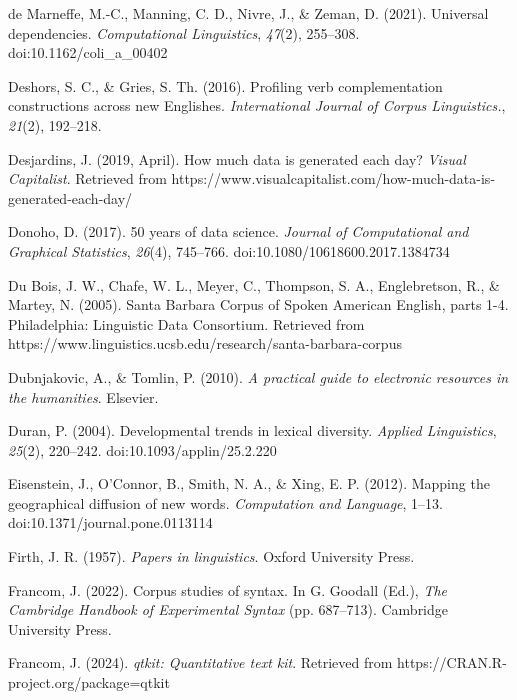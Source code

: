 \documentclass[
  letterpaper,
  krantz1]{latex/krantz-mod}
\newlength{\cslhangindent}
\newenvironment{CSLReferences}[2] %
 {\begin{list}{}{%
  \setlength{\itemindent}{0pt}
  \setlength{\leftmargin}{0pt}
  \setlength{\parsep}{0pt}
  \ifodd #1
   \setlength{\leftmargin}{\cslhangindent}
   \setlength{\itemindent}{-1\cslhangindent}
  \fi
  \setlength{\itemsep}{#2\baselineskip}}}
 {\end{list}}
\theoremstyle{definition}
\theoremstyle{definition}
\theoremstyle{remark}
\begin{document}
\begin{CSLReferences}{1}{0}
de Marneffe, M.-C., Manning, C. D., Nivre, J., \& Zeman, D. (2021).
Universal dependencies. \emph{Computational Linguistics}, \emph{47}(2),
255--308. doi:10.1162/coli\_a\_00402

Deshors, S. C., \& Gries, S. Th. (2016). Profiling verb complementation
constructions across new {Englishes}. \emph{International Journal of
Corpus Linguistics.}, \emph{21}(2), 192--218.

Desjardins, J. (2019, April). How much data is generated each day?
\emph{Visual Capitalist}. Retrieved from
https://www.visualcapitalist.com/how-much-data-is-generated-each-day/

Donoho, D. (2017). 50 years of data science. \emph{Journal of
Computational and Graphical Statistics}, \emph{26}(4), 745--766.
doi:10.1080/10618600.2017.1384734

Du Bois, J. W., Chafe, W. L., Meyer, C., Thompson, S. A., Englebretson,
R., \& Martey, N. (2005). Santa {Barbara Corpus} of {Spoken American
English}, parts 1-4. Philadelphia: Linguistic Data Consortium. Retrieved
from https://www.linguistics.ucsb.edu/research/santa-barbara-corpus

Dubnjakovic, A., \& Tomlin, P. (2010). \emph{A practical guide to
electronic resources in the humanities}. Elsevier.

Duran, P. (2004). Developmental trends in lexical diversity.
\emph{Applied Linguistics}, \emph{25}(2), 220--242.
doi:10.1093/applin/25.2.220

Eisenstein, J., O'Connor, B., Smith, N. A., \& Xing, E. P. (2012).
Mapping the geographical diffusion of new words. \emph{Computation and
Language}, 1--13. doi:10.1371/journal.pone.0113114

Firth, J. R. (1957). \emph{Papers in linguistics}. Oxford University
Press.

Francom, J. (2022). Corpus studies of syntax. In G. Goodall (Ed.),
\emph{The {Cambridge Handbook} of {Experimental Syntax}} (pp. 687--713).
Cambridge University Press.

Francom, J. (2024). \emph{{qtkit}: Quantitative text kit}. Retrieved
from https://CRAN.R-project.org/package=qtkit


\end{CSLReferences}
\end{document}
